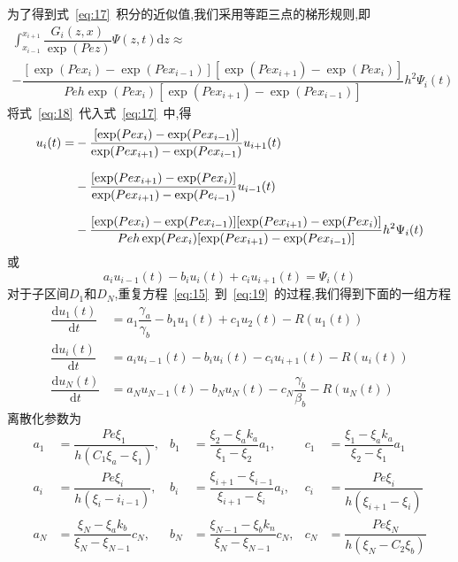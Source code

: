 \documentclass[a4paper,cs4size,adobefonts,cm-default,no-math]{ctexart}
\newcommand{\dif}{\mathrm{d}}
\begin{document}
为了得到式~\ref{eq:17}~积分的近似值,我们采用等距三点的梯形规则,即
\begin{multline}\label{eq:18}
 \int_{x_{i-1}}^{x_{i+1}}\dfrac{G_i(z,x)}{\exp(Pez)}\Psi(z,t)\dif z \approx\\
 -\dfrac{[\exp(Pex_i)-\exp(Pex_{i-1})][\exp(Pex_{i+1})-\exp(Pex_i)]}{Peh\exp(Pex_i)[\exp(Pex_{i+1})-\exp(Pex_{i-1})]}
 h^2\Psi_i(t)
\end{multline}
将式~\ref{eq:18}~代入式~\ref{eq:17}~中,得
\begin{equation*}
 \begin{split}
  u_i(t)=&-\dfrac{[\exp(Pex_i)-\exp(Pex_{i-1})]}{\exp(Pex_{i+1})-\exp(Pex_{i-1})}u_{i+1}(t)\\[0.5\baselineskip]
        &-\dfrac{[\exp(Pex_{i+1})-\exp(Pex_i)]}{\exp(Pex_{i+1})-\exp(Pe_{i-1})}u_{i-1}(t) \\[0.5\baselineskip]
        &-\dfrac{[\exp(Pex_i)-\exp(Pex_{i-1})][\exp(Pex_{i+1})-\exp(Pex_i)]}{Peh\exp(Pex_i)[\exp(Pex_{i+1})-\exp(Pex_{i-1})]}
 h^2\Psi_i(t)
 \end{split}
\end{equation*}
或
\begin{equation}\label{eq:19}
 a_i u_{i-1}(t)-b_iu_i(t)+c_iu_{i+1}(t)=\Psi_i(t)
\end{equation}
对于子区间$D_1$和$D_N$,重复方程~\ref{eq:15}~到~\ref{eq:19}~的过程,我们得到下面的一组方程
\begin{equation}\label{eq:20}
 \begin{aligned}
  \dfrac{\dif u_1(t)}{\dif t} &=a_1\dfrac{\gamma_a}{\gamma_b}-b_1u_1(t)+c_1u_2(t)-R(u_1(t))\\
  \dfrac{\dif u_i(t)}{\dif t} &=a_iu_{i-1}(t)-b_iu_i(t)-c_iu_{i+1}(t)-R(u_i(t))\\
  \dfrac{\dif u_N(t)}{\dif t} &=a_Nu_{N-1}(t)-b_Nu_N(t)-c_N\dfrac{\gamma_b}{\beta_b}-R(u_N(t))
 \end{aligned}
\end{equation}
离散化参数为
\begin{align*}
 a_1 &=\dfrac{Pe\xi_1}{h(C_1\xi_a-\xi_1)},& b_1&=\dfrac{\xi_2-\xi_a k_a}{\xi_1-\xi_2}a_1, & c_1&=\dfrac{\xi_1-\xi_a k_a}{\xi_2-\xi_1}a_1 \\
 a_i &=\dfrac{Pe\xi_i}{h(\xi_i-i_{i-1})},& b_i&=\dfrac{\xi_{i+1}-\xi_{i-1}}{\xi_{i+1}-\xi_i}a_i, & c_i &=\dfrac{Pe\xi_i}{h(\xi_{i+1}-\xi_{i})}\\
 a_N &=\dfrac{\xi_N-\xi_a k_b}{\xi_N-\xi_{N-1}}c_N,& b_N&=\dfrac{\xi_{N-1}-\xi_b k_n}{\xi_N-\xi_{N-1}}c_N,& c_N&=\dfrac{Pe\xi_N}{h(\xi_N-C_2\xi_b)}
\end{align*}
\end{document}
